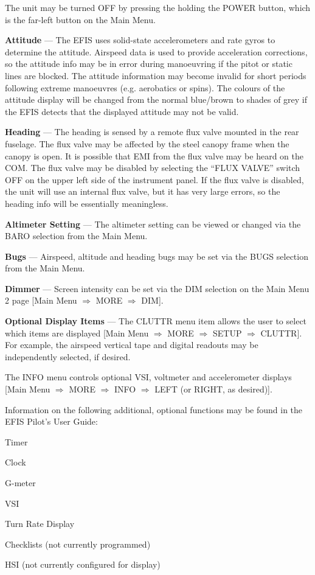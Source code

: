 The unit may be turned OFF by pressing the holding the POWER button, which is the far-left button on the Main Menu.

\textbf{Attitude} --- The EFIS uses solid-state accelerometers and rate gyros to determine the attitude. Airspeed data is used to provide acceleration corrections, so the attitude info may be in error during manoeuvring if the pitot or static lines are blocked. The attitude information may become invalid for short periods following extreme manoeuvres (e.g. aerobatics or spins). The colours of the attitude display will be changed from the normal blue/brown to shades of grey if the EFIS detects that the displayed attitude may not be valid.

\textbf{Heading} --- The heading is sensed by a remote flux valve mounted in the rear fuselage. The flux valve may be affected by the steel canopy frame when the canopy is open. It is possible that EMI from the flux valve may be heard on the COM. The flux valve may be disabled by selecting the ``FLUX VALVE'' switch OFF on the upper left side of the instrument panel. If the flux valve is disabled, the unit will use an internal flux valve, but it has very large errors, so the heading info will be essentially meaningless.

\textbf{Altimeter Setting} --- The altimeter setting can be viewed or changed via the BARO selection from the Main Menu.

\textbf{Bugs} --- Airspeed, altitude and heading bugs may be set via the BUGS selection from the Main Menu.

\textbf{Dimmer} --- Screen intensity can be set via the DIM selection on the Main Menu 2 page {[}Main Menu $\Rightarrow$ MORE $\Rightarrow$ DIM{]}.

\textbf{Optional Display Items} --- The CLUTTR menu item allows the user to select which items are displayed {[}Main Menu $\Rightarrow$ MORE $\Rightarrow$ SETUP $\Rightarrow$ CLUTTR{]}. For example, the airspeed vertical tape and digital readouts may be independently selected, if desired. 

The INFO menu controls optional VSI, voltmeter and accelerometer displays {[}Main Menu $\Rightarrow$ MORE $\Rightarrow$ INFO $\Rightarrow$ LEFT (or RIGHT, as desired){]}.

Information on the following additional, optional functions may be found in the EFIS Pilot's User Guide:

\begin{itemize*}
\item Timer 
\item Clock 
\item G-meter 
\item VSI 
\item Turn Rate Display 
\item Checklists (not currently programmed)
\item HSI (not currently configured for display)
\end{itemize*}

